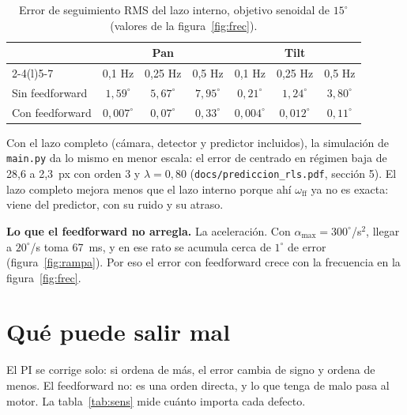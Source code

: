 \documentclass[11pt,a4paper]{article}
\newcommand{\cod}[1]{\texttt{#1}}
\newcommand{\lam}{\lambda}
\newcommand{\gr}{^{\circ}}
\begin{document}
\begin{table}[H]
\centering\small
\caption{Error de seguimiento RMS del lazo interno, objetivo senoidal de $15\gr$ (valores de la figura~\ref{fig:frec}).}
\begin{tabular}{@{}lcccccc@{}}
\toprule
 & \multicolumn{3}{c}{Pan} & \multicolumn{3}{c}{Tilt} \\
\cmidrule(lr){2-4}\cmidrule(l){5-7}
 & 0,1 Hz & 0,25 Hz & 0,5 Hz & 0,1 Hz & 0,25 Hz & 0,5 Hz \\
\midrule
Sin feedforward & $1{,}59\gr$ & $5{,}67\gr$ & $7{,}95\gr$ & $0{,}21\gr$ & $1{,}24\gr$ & $3{,}80\gr$ \\
Con feedforward & $0{,}007\gr$ & $0{,}07\gr$ & $0{,}33\gr$ & $0{,}004\gr$ & $0{,}012\gr$ & $0{,}11\gr$ \\
\bottomrule
\end{tabular}
\end{table}

Con el lazo completo (cámara, detector y predictor incluidos), la simulación de \cod{main.py} da lo mismo en
menor escala: el error de centrado en régimen baja de 28,6 a 2,3~px con orden 3 y $\lam = 0{,}80$
(\cod{docs/prediccion\_rls.pdf}, sección 5). El lazo completo mejora menos que el lazo interno porque ahí
$\omega_{\mathrm{ff}}$ ya no es exacta: viene del predictor, con su ruido y su atraso.

\textbf{Lo que el feedforward no arregla.} La aceleración. Con $\alpha_{\max} = 300\gr$/s$^2$, llegar a $20\gr$/s
toma 67~ms, y en ese rato se acumula cerca de $1\gr$ de error (figura~\ref{fig:rampa}). Por eso el error con
feedforward crece con la frecuencia en la figura~\ref{fig:frec}.

\section{Qué puede salir mal}

El PI se corrige solo: si ordena de más, el error cambia de signo y ordena de menos. El feedforward no: es una
orden directa, y lo que tenga de malo pasa al motor. La tabla~\ref{tab:sens} mide cuánto importa cada defecto.
\end{document}
